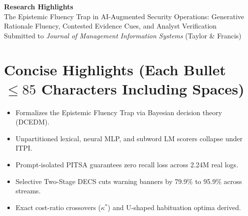 \documentclass[11pt,a4paper]{article}
\begin{document}
\thispagestyle{empty}

\begin{center}
  {\LARGE\bfseries Research Highlights}\\[0.5em]
  {\large The Epistemic Fluency Trap in AI-Augmented Security Operations: Generative Rationale Fluency, Contested Evidence Cues, and Analyst Verification}\\[0.4em]
  {\small Submitted to \textit{Journal of Management Information Systems} (Taylor \& Francis)}
\end{center}

\medskip
\section*{Concise Highlights (Each Bullet $\le 85$ Characters Including Spaces)}
\begin{itemize}[leftmargin=1.8em, itemsep=4pt]
  \item Formalizes the Epistemic Fluency Trap via Bayesian decision theory (DCEDM).
  \item Unpartitioned lexical, neural MLP, and subword LM scorers collapse under ITPI.
  \item Prompt-isolated PITSA guarantees zero recall loss across 2.24M real logs.
  \item Selective Two-Stage DECS cuts warning banners by 79.9\% to 95.9\% across streams.
  \item Exact cost-ratio crossovers ($\kappa^*$) and U-shaped habituation optima derived.
\end{itemize}
\end{document}
